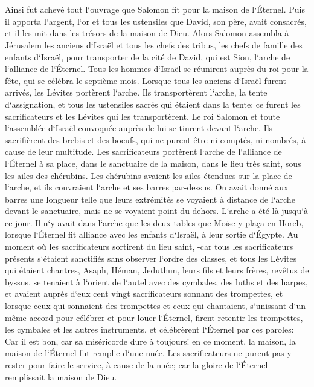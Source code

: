 \chapter{}

\verse Ainsi fut achevé tout l`ouvrage que Salomon fit pour la maison de l`Éternel. Puis il apporta l`argent, l`or et tous les ustensiles que David, son père, avait consacrés, et il les mit dans les trésors de la maison de Dieu. 
\verse Alors Salomon assembla à Jérusalem les anciens d`Israël et tous les chefs des tribus, les chefs de famille des enfants d`Israël, pour transporter de la cité de David, qui est Sion, l`arche de l`alliance de l`Éternel. 
\verse Tous les hommes d`Israël se réunirent auprès du roi pour la fête, qui se célébra le septième mois. 
\verse Lorsque tous les anciens d`Israël furent arrivés, les Lévites portèrent l`arche. 
\verse Ils transportèrent l`arche, la tente d`assignation, et tous les ustensiles sacrés qui étaient dans la tente: ce furent les sacrificateurs et les Lévites qui les transportèrent. 
\verse Le roi Salomon et toute l`assemblée d`Israël convoquée auprès de lui se tinrent devant l`arche. Ils sacrifièrent des brebis et des boeufs, qui ne purent être ni comptés, ni nombrés, à cause de leur multitude. 
\verse Les sacrificateurs portèrent l`arche de l`alliance de l`Éternel à sa place, dans le sanctuaire de la maison, dans le lieu très saint, sous les ailes des chérubins. 
\verse Les chérubins avaient les ailes étendues sur la place de l`arche, et ils couvraient l`arche et ses barres par-dessus. 
\verse On avait donné aux barres une longueur telle que leurs extrémités se voyaient à distance de l`arche devant le sanctuaire, mais ne se voyaient point du dehors. L`arche a été là jusqu`à ce jour. 
\verse Il n`y avait dans l`arche que les deux tables que Moïse y plaça en Horeb, lorsque l`Éternel fit alliance avec les enfants d`Israël, à leur sortie d`Égypte. 
\verse Au moment où les sacrificateurs sortirent du lieu saint, -car tous les sacrificateurs présents s`étaient sanctifiés sans observer l`ordre des classes, 
\verse et tous les Lévites qui étaient chantres, Asaph, Héman, Jeduthun, leurs fils et leurs frères, revêtus de byssus, se tenaient à l`orient de l`autel avec des cymbales, des luths et des harpes, et avaient auprès d`eux cent vingt sacrificateurs sonnant des trompettes, 
\verse et lorsque ceux qui sonnaient des trompettes et ceux qui chantaient, s`unissant d`un même accord pour célébrer et pour louer l`Éternel, firent retentir les trompettes, les cymbales et les autres instruments, et célébrèrent l`Éternel par ces paroles: Car il est bon, car sa miséricorde dure à toujours! en ce moment, la maison, la maison de l`Éternel fut remplie d`une nuée. 
\verse Les sacrificateurs ne purent pas y rester pour faire le service, à cause de la nuée; car la gloire de l`Éternel remplissait la maison de Dieu. 

